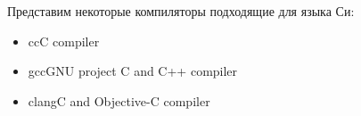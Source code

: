 Представим некоторые компиляторы подходящие для языка Си:

\begin{itemize}
		
	\item
	\begin{myenv}{cc}{C compiler}
	\end{myenv}
			
	\item
	\begin{myenv}{gcc}{GNU project C and C++ compiler}
	\end{myenv}
			
	\item
	\begin{myenv}{clang}{C and Objective-C compiler}
	\end{myenv}
			
\end{itemize}
